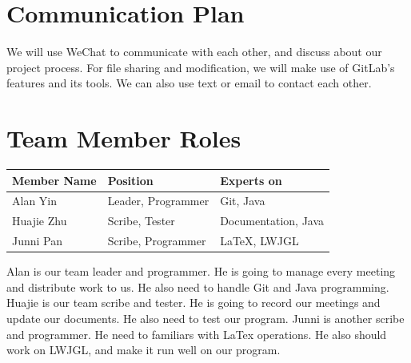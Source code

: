 \documentclass[12pt]{article}
\begin{document}
\newpage
\section{Communication Plan}
We will use WeChat to communicate with each other, and discuss about our project process. For file sharing and modification, we will make use of GitLab's features and its tools. We can also use text or email to contact each other.

\section{Team Member Roles}
\begin{tabular}{ | m{8em} | m{4.5cm}| m{4.5cm} | } 
\hline
Member Name & Position & Experts on \\
\hline
Alan Yin & Leader, Programmer & Git, Java \\ 
\hline
Huajie Zhu & Scribe, Tester & Documentation, Java  \\ 
\hline
Junni Pan & Scribe, Programmer & LaTeX, LWJGL\\ 
\hline
\end{tabular}

\noindent
\newline
Alan is our team leader and programmer. He is going to manage every meeting and distribute work to us. He also need to handle Git and Java programming. Huajie is our team scribe and tester. He is going to record our meetings and update our documents. He also need to test our program. Junni is another scribe and programmer. He need to familiars with LaTex operations. He also should work on LWJGL, and make it run well on our program.
\end{document}
